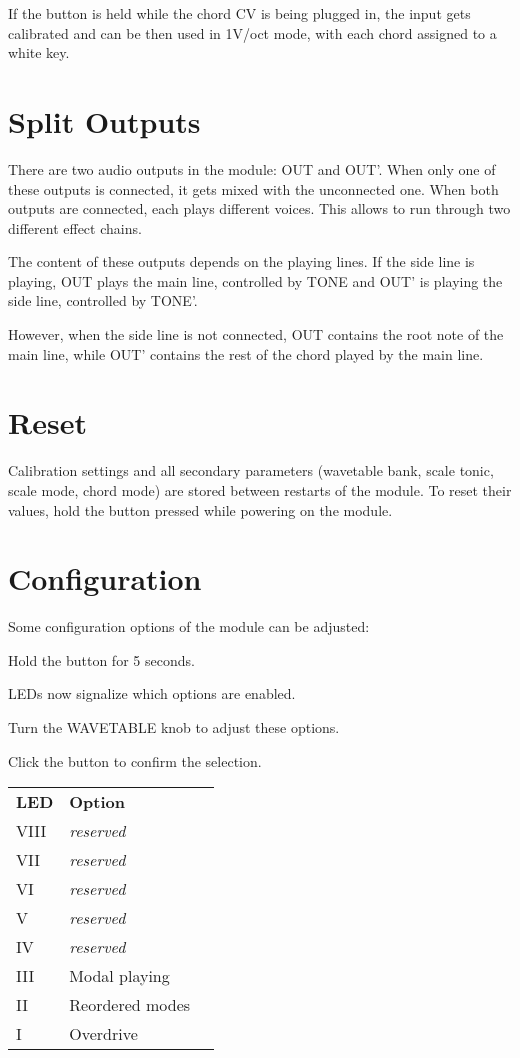 \documentclass[10pt,nofoldmark,nocombine]{leaflet} %
\newenvironment{packed_enumerate}{
\begin{enumerate}
  \setlength{\itemsep}{1pt}
  \setlength{\parskip}{0pt}
  \setlength{\parsep}{0pt}
}{\end{enumerate}}
\begin{document}
If the button is held while the chord CV is being plugged in, the input gets calibrated and can be then used in 1V/oct mode, with each chord assigned to a white key.

\section{Split Outputs}

There are two audio outputs in the module: OUT and OUT'. When only one of these outputs is connected, it gets mixed with the unconnected one. When both outputs are connected, each plays different voices. This allows to run through two different effect chains.

The content of these outputs depends on the playing lines. If the side line is playing, OUT plays the main line, controlled by TONE and OUT' is playing the side line, controlled by TONE'.

However, when the side line is not connected, OUT contains the root note of the main line, while OUT' contains the rest of the chord played by the main line.

\section{Reset}

Calibration settings and all secondary parameters (wavetable bank, scale tonic, scale mode, chord mode) are stored between restarts of the module. To reset their values, hold the button pressed while powering on the module.

\section{Configuration}

Some configuration options of the module can be adjusted:

\begin{packed_enumerate}
  \item Hold the button for 5 seconds.
  \item LEDs now signalize which options are enabled.
  \item Turn the WAVETABLE knob to adjust these options.
  \item Click the button to confirm the selection.
\end{packed_enumerate}

\begin{tabular}{@{}lll@{}}
  \textbf{LED} & \textbf{Option} \\
  VIII & \textit{reserved} \\
  VII  & \textit{reserved} \\
  VI   & \textit{reserved} \\
  V    & \textit{reserved} \\
  IV   & \textit{reserved} \\
  III  & Modal playing \\
  II   & Reordered modes \\
  I    & Overdrive
\end{tabular}
\end{document}
